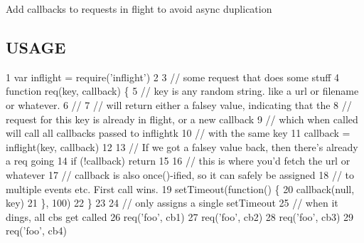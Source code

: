 Add callbacks to requests in flight to avoid async duplication

\subsection*{U\+S\+A\+G\+E}


\begin{DoxyCode}
1 var inflight = require('inflight')
2 
3 // some request that does some stuff
4 function req(key, callback) \{
5   // key is any random string.  like a url or filename or whatever.
6   //
7   // will return either a falsey value, indicating that the
8   // request for this key is already in flight, or a new callback
9   // which when called will call all callbacks passed to inflightk
10   // with the same key
11   callback = inflight(key, callback)
12 
13   // If we got a falsey value back, then there's already a req going
14   if (!callback) return
15 
16   // this is where you'd fetch the url or whatever
17   // callback is also once()-ified, so it can safely be assigned
18   // to multiple events etc.  First call wins.
19   setTimeout(function() \{
20     callback(null, key)
21   \}, 100)
22 \}
23 
24 // only assigns a single setTimeout
25 // when it dings, all cbs get called
26 req('foo', cb1)
27 req('foo', cb2)
28 req('foo', cb3)
29 req('foo', cb4)
\end{DoxyCode}
 